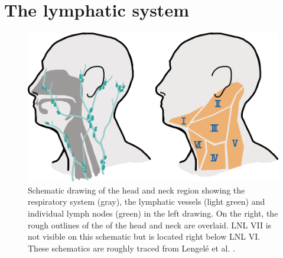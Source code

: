 \documentclass[\relativeRoot/main.tex]{subfiles}
\begin{document}
\section{The lymphatic system}
\label{sec:intro:lymph_system}

\begin{figure}
    \centering
    \includegraphics[width=\textwidth]{figures/schematics_head.pdf}
    \caption[
        Schematics of the head and neck regions with the anatomically defined LNLs
    ]{
        Schematic drawing of the head and neck region showing the respiratory system (gray), the lymphatic vessels (light green) and individual lymph nodes (green) in the left drawing. On the right, the rough outlines of the  of the head and neck are overlaid. LNL VII is not visible on this schematic but is located right below LNL VI. These schematics are roughly traced from Lengelé et al. \cite{lengele_anatomical_2007}.
    }
    \label{fig:intro:schematics_head}
\end{figure}
\end{document}
